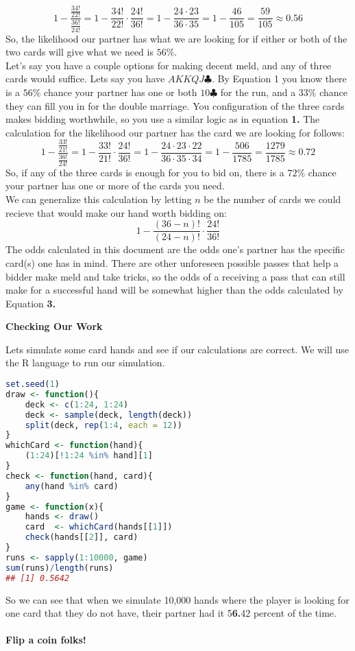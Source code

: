 \documentclass[11pt]{article}
\begin{document}
\begin{equation}
1-\frac{\frac{34!}{22!}}{\frac{36!}{24!}}=1-\frac{34!}{22!}\cdot \frac{24!}{36!}=1-\frac{24\cdot23}{36\cdot35}=1-\frac{46}{105}=\frac{59}{105}\approx 0.56
\end{equation}
So, the likelihood our partner has what we are looking for if either or both of the two cards will give what we need is $56\%$.\\
\indent Let's say you have a couple options for making decent meld, and any of three cards would suffice. Lets say you have $AKKQJ\clubsuit$. By Equation 1 you know there is a $56\%$ chance your partner has one or both $10\clubsuit$ for the run, and a $33\%$ chance they can fill you in for the double marriage. You configuration of the three cards makes bidding worthwhile, so you use a similar logic as in equation \textbf{1.} The calculation for the likelihood our partner has the card we are looking for follows:
\begin{equation}
 1-\frac{\frac{33!}{21!}}{\frac{36!}{24!}}=1-\frac{33!}{21!}\cdot \frac{24!}{36!}=1-\frac{24\cdot 23\cdot 22}{36\cdot 35\cdot 34}=1-\frac{506}{1785}=\frac{1279}{1785}\approx 0.72
\end{equation}
So, if any of the three cards is enough for you to bid on, there is a $72\%$ chance your partner has one or more of the cards you need.\\
\indent We can generalize this calculation by letting $n$ be the number of cards we could recieve that would make our hand worth bidding on:
\begin{equation}
1-\frac{(36-n)!}{(24-n)!}\cdot \frac{24!}{36!}
\end{equation}
The odds calculated in this document are the odds one's partner has the specific card(s) one has in mind. There are other unforeseen possible passes that help a bidder make meld and take tricks, so the odds of a receiving a pass that can still make for a successful hand will be somewhat higher than the odds calculated by Equation \textbf{3.}\\
\begin{center}
  \textbf{Checking Our Work}
\end{center}
Lets simulate some card hands and see if our calculations are correct.
We will use the R language to run our simulation.
\begin{lstlisting}[language=R]
set.seed(1)
draw <- function(){
    deck <- c(1:24, 1:24)
    deck <- sample(deck, length(deck))
    split(deck, rep(1:4, each = 12))
}
whichCard <- function(hand){
    (1:24)[!1:24 %in% hand][1]
}
check <- function(hand, card){
    any(hand %in% card)
}
game <- function(x){
    hands <- draw()
    card  <- whichCard(hands[[1]])
    check(hands[[2]], card)
}
runs <- sapply(1:10000, game)
sum(runs)/length(runs)
## [1] 0.5642
\end{lstlisting}
So we can see that when we simulate 10,000 hands where the player is looking for one card that they do not have, their partner had it 5\textbf{6.}42 percent of the time.\\
\\
\textbf{Flip a coin folks!}
\end{document}
